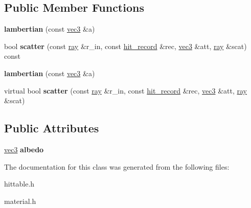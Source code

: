 \subsection*{Public Member Functions}
\begin{DoxyCompactItemize}
\item 
\mbox{\label{classlambertian_aaff523a9a978e937a82739909acf316c}} 
{\bfseries lambertian} (const \hyperlink{classvec3}{vec3} \&a)
\item 
\mbox{\label{classlambertian_a191e17273b069e21fc0f4b7fed8337f9}} 
bool {\bfseries scatter} (const \hyperlink{classray}{ray} \&r\+\_\+in, const \hyperlink{structhit__record}{hit\+\_\+record} \&rec, \hyperlink{classvec3}{vec3} \&att, \hyperlink{classray}{ray} \&scat) const
\item 
\mbox{\label{classlambertian_aaff523a9a978e937a82739909acf316c}} 
{\bfseries lambertian} (const \hyperlink{classvec3}{vec3} \&a)
\item 
\mbox{\label{classlambertian_a7610f6ebbc037003adfb4a8ad7b36871}} 
virtual bool {\bfseries scatter} (const \hyperlink{classray}{ray} \&r\+\_\+in, const \hyperlink{structhit__record}{hit\+\_\+record} \&rec, \hyperlink{classvec3}{vec3} \&att, \hyperlink{classray}{ray} \&scat)
\end{DoxyCompactItemize}
\subsection*{Public Attributes}
\begin{DoxyCompactItemize}
\item 
\mbox{\label{classlambertian_a81dc7cd414273c1bec5409e6bfe18f95}} 
\hyperlink{classvec3}{vec3} {\bfseries albedo}
\end{DoxyCompactItemize}


The documentation for this class was generated from the following files\+:\begin{DoxyCompactItemize}
\item 
hittable.\+h\item 
material.\+h\end{DoxyCompactItemize}
